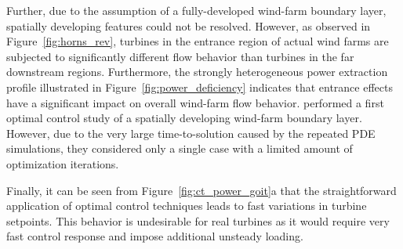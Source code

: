 Further, due to the assumption of a fully-developed wind-farm boundary layer, spatially developing features could not be resolved. However, as observed in Figure~\ref{fig:horns_rev}, turbines in the entrance region of actual wind farms are subjected to significantly different flow behavior than turbines in the far downstream regions. Furthermore, the strongly heterogeneous power extraction profile illustrated in Figure~\ref{fig:power_deficiency} indicates that entrance effects have a significant impact on overall wind-farm flow behavior. \cite{goit2016optimal} performed a first optimal control study of a spatially developing wind-farm boundary layer. However, due to the very large time-to-solution caused by the repeated PDE simulations, they considered only a single case with a limited amount of optimization iterations. 
%

Finally, it can be seen from Figure~\ref{fig:ct_power_goit}a that the straightforward application of optimal control techniques leads to fast variations in turbine setpoints. This behavior is undesirable for real turbines as it would require very fast control response and impose additional unsteady loading.


